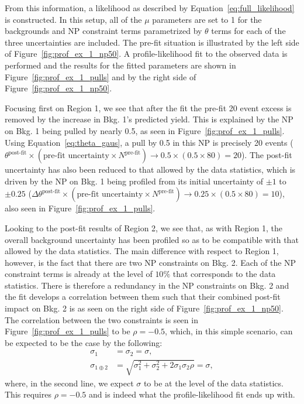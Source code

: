 From this information, a likelihood as described by Equation~\ref{eq:full_likelihood} is constructed.
In this setup, all of the $\mu$ parameters are set to 1 for the backgrounds
and NP constraint terms parametrized by $\theta$ terms
for each of the three uncertainties are included.
The pre-fit situation is illustrated by the left side of Figure~\ref{fig:prof_ex_1_np50}.
A profile-likelihood fit to the observed data is performed and the results for the fitted parameters
are shown in Figure~\ref{fig:prof_ex_1_pulls} and by the
right side of Figure~\ref{fig:prof_ex_1_np50}.

Focusing first on Region 1, we see that after the fit the pre-fit 20 event excess is removed by
the increase in Bkg. 1's predicted yield.
This is explained by the NP on Bkg. 1 being pulled by nearly 0.5, as seen in Figure~\ref{fig:prof_ex_1_pulls}.
Using Equation~\ref{eq:theta_gaus}, a pull by 0.5 in this NP is precisely 20 events ($\theta^{\text{post-fit}} \times ( \text{pre-fit uncertainty} \times N^{\text{pre-fit}}) \rightarrow 0.5 \times (0.5 \times 80) = 20$).
The post-fit uncertainty has also been reduced to that allowed by the data statistics, which is driven
by the NP on Bkg. 1 being profiled from its initial uncertainty of $\pm 1$ to $\pm 0.25$ ($\Delta \theta^{\text{post-fit}} \times (\text{pre-fit uncertainty} \times N^{\text{pre-fit}}) \rightarrow 0.25 \times (0.5 \times 80) = 10$), also seen in Figure~\ref{fig:prof_ex_1_pulls}.

Looking to the post-fit results of Region 2, we see that, as with Region 1, the overall
background uncertainty has been profiled so as to be compatible with that allowed by the data statistics.
The main difference with respect to Region 1, however, is the fact that there are two NP constraints
on Bkg. 2.
Each of the NP constraint terms is already at the level of $10\%$ that corresponds to the data statistics.
There is therefore a redundancy in the NP constraints on Bkg. 2 and the fit develops a correlation between
them such that their combined post-fit impact on Bkg. 2 is as seen on the right side of Figure~\ref{fig:prof_ex_1_np50}.
The correlation between the two constraints is seen in Figure~\ref{fig:prof_ex_1_pulls} to be $\rho = -0.5$,
which, in this simple scenario, can be expected to be the case by the following:
\begin{align}
    \sigma_{1} &= \sigma_{2} = \sigma, \nonumber \\
    \sigma_{1 \oplus 2} &= \sqrt{ \sigma_1^2 + \sigma_2^2 + 2 \sigma_1 \sigma_2 \rho } = \sigma, \nonumber
\end{align}
where, in the second line, we expect $\sigma$ to be at the level of the data statistics.
This requires $\rho = -0.5$ and is indeed what the profile-likelihood fit ends up with.

